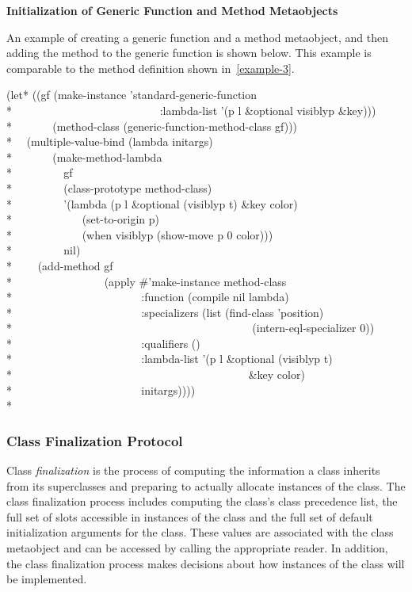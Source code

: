 \textbf{Initialization of Generic Function and Method Metaobjects}

An example of creating a generic function and a method metaobject, and then
adding the method to the generic function is shown below. This example is
comparable to the method definition shown in~\ref{example-3}.

\begin{lisp}
(let* ((gf (make-instance 'standard-generic-function\\*
~~~~~~~~~~~~~~~~~~~~~~~~~~:lambda-list '(p l \&optional visiblyp \&key)))\\*
~~~~~~ (method-class (generic-function-method-class gf)))\\*
~~(multiple-value-bind (lambda initargs)\\*
~~~~~~ (make-method-lambda\\*
~~~~~~~~ gf\\*
~~~~~~~~ (class-prototype method-class)\\*
~~~~~~~~ '(lambda (p l \&optional (visiblyp t) \&key color)\\*
~~~~~~~~~~~~(set-to-origin p)\\*
~~~~~~~~~~~~(when visiblyp (show-move p 0 color)))\\*
~~~~~~~~ nil)\\*
~~~~(add-method gf\\*
~~~~~~~~~~~~~~~~(apply \#'make-instance method-class\\*
~~~~~~~~~~~~~~~~~~~~~~ :function (compile nil lambda)\\*
~~~~~~~~~~~~~~~~~~~~~~ :specializers (list (find-class 'position)\\*
~~~~~~~~~~~~~~~~~~~~~~~~~~~~~~~~~~~~~~~~~~ (intern-eql-specializer 0))\\*
~~~~~~~~~~~~~~~~~~~~~~ :qualifiers ()\\*
~~~~~~~~~~~~~~~~~~~~~~ :lambda-list '(p l \&optional (visiblyp t)\\*
~~~~~~~~~~~~~~~~~~~~~~~~~~~~~~~~~~~~~~~~~~\&key color)\\*
~~~~~~~~~~~~~~~~~~~~~~ initargs))))\\*
\end{lisp}
                     
\subsubsection{Class Finalization Protocol}
\label{CLASS-FINALIZATION-PROTOCOL}

Class \emph{finalization} is the process of computing the information a class inherits
from its superclasses and preparing to actually allocate instances of the
class. The class finalization process includes computing the class's class
precedence list, the full set of slots accessible in instances of the class and
the full set of default initialization arguments for the class. These values are
associated with the class metaobject and can be accessed by calling the
appropriate reader. In addition, the class finalization process makes decisions
about how instances of the class will be implemented. 

